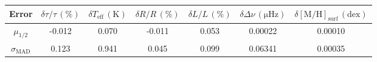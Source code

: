 \begin{tabular}{ccccccc}
\toprule
\textbf{Error} &  $\delta \tau/\tau\,(\%)$ &  $\delta T_\mathrm{eff}\,(\mathrm{K})$ &  $\delta R/R\,(\%)$ &  $\delta L/L\,(\%)$ &  $\delta \Delta\nu\,(\mathrm{\mu Hz})$ &  $\delta [\mathrm{M}/\mathrm{H}]_\mathrm{surf}\,(\mathrm{dex})$ \\
\midrule
$\mu_{1/2}$           &                    -0.012 &                                  0.070 &              -0.011 &               0.053 &                                0.00022 &                                                         0.00010 \\
$\sigma_\mathrm{MAD}$ &                     0.123 &                                  0.941 &               0.045 &               0.099 &                                0.06341 &                                                         0.00035 \\
\bottomrule
\end{tabular}
